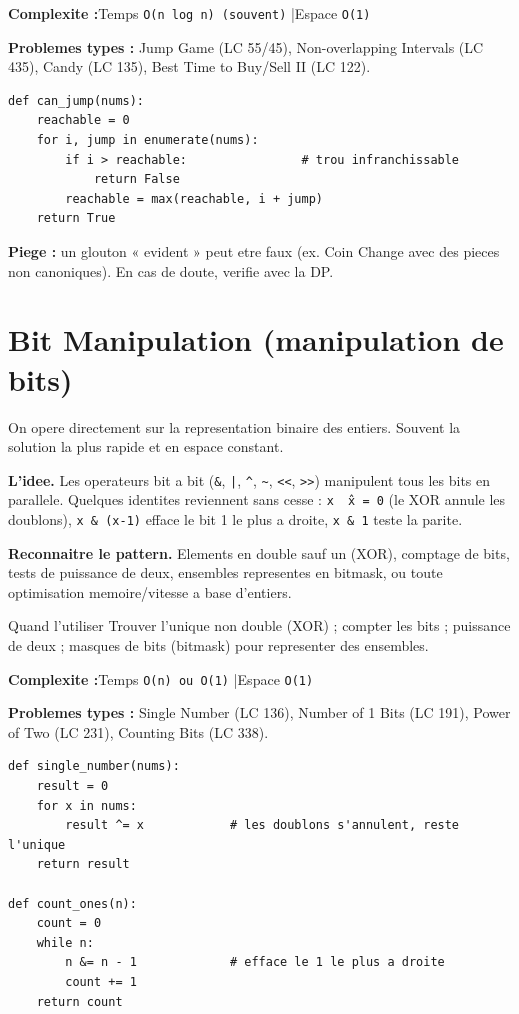 \documentclass[11pt,a4paper]{article}
\newcommand{\complexite}[2]{%
  \noindent\textbf{Complexite :}\quad Temps \texttt{#1} \quad|\quad Espace \texttt{#2}\par\smallskip}
\newcommand{\leetcode}[1]{\noindent\textbf{Problemes types :} #1\par\medskip}
\begin{document}
\complexite{O(n log n) (souvent)}{O(1)}
\leetcode{Jump Game (LC 55/45), Non-overlapping Intervals (LC 435), Candy (LC 135), Best Time to Buy/Sell II (LC 122).}

\begin{lstlisting}
def can_jump(nums):
    reachable = 0
    for i, jump in enumerate(nums):
        if i > reachable:                # trou infranchissable
            return False
        reachable = max(reachable, i + jump)
    return True
\end{lstlisting}

\textbf{Piege :} un glouton « evident » peut etre faux (ex. Coin Change avec des
pieces non canoniques). En cas de doute, verifie avec la DP.

\section{Bit Manipulation (manipulation de bits)}
On opere directement sur la representation binaire des entiers. Souvent la
solution la plus rapide et en espace constant.

\textbf{L'idee.} Les operateurs bit a bit (\texttt{\&}, \texttt{|}, \texttt{\^},
\texttt{\~}, \texttt{<<}, \texttt{>>}) manipulent tous les bits en parallele.
Quelques identites reviennent sans cesse : \texttt{x \^\ x = 0} (le XOR annule les
doublons), \texttt{x \& (x-1)} efface le bit 1 le plus a droite, \texttt{x \& 1}
teste la parite.

\textbf{Reconnaitre le pattern.} Elements en double sauf un (XOR), comptage de
bits, tests de puissance de deux, ensembles representes en bitmask, ou toute
optimisation memoire/vitesse a base d'entiers.

\begin{infobox}{Quand l'utiliser}
Trouver l'unique non double (XOR) ; compter les bits ; puissance de deux ; masques
de bits (bitmask) pour representer des ensembles.
\end{infobox}

\complexite{O(n) ou O(1)}{O(1)}
\leetcode{Single Number (LC 136), Number of 1 Bits (LC 191), Power of Two (LC 231), Counting Bits (LC 338).}

\begin{lstlisting}
def single_number(nums):
    result = 0
    for x in nums:
        result ^= x            # les doublons s'annulent, reste l'unique
    return result

def count_ones(n):
    count = 0
    while n:
        n &= n - 1             # efface le 1 le plus a droite
        count += 1
    return count
\end{lstlisting}
\end{document}
